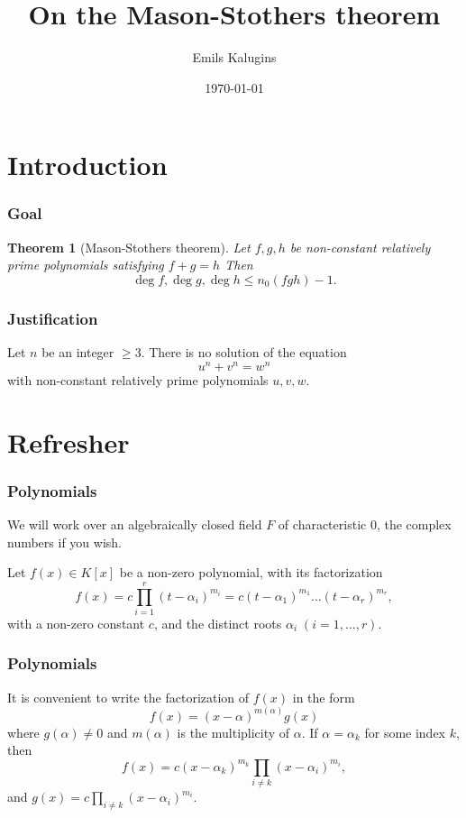 \documentclass[envcountsect]{beamer}
\author{Emils Kalugins}
\title{On the Mason-Stothers theorem}
\institute{University of Latvia}
\date{\today}
\newtheorem*{theorem*}{Theorem}
\begin{document}
\begin{frame}
\maketitle

\end{frame}

\section{Introduction}

\begin{frame}
\frametitle{Goal}

\begin{theorem*}[Mason-Stothers theorem]
Let $f,g,h$ be non-constant relatively prime polynomials satisfying $f+g=h$
Then \[\operatorname{deg}f, \operatorname{deg}g, \operatorname{deg}h \leq
  n_0(fgh) -1.\]
\end{theorem*}
\end{frame}

\begin{frame}
\frametitle{Justification}
\begin{theorem}
Let $n$ be an integer $\geq 3.$ There is no solution of the equation \[u^n +
  v^n = w^n\] with non-constant relatively prime polynomials $u,v,w$. 
\end{theorem}

\end{frame}

\section{Refresher}
\begin{frame}
\frametitle{Polynomials}
We will work over an algebraically closed field $F$ of characteristic 0, the complex
numbers if you wish.

Let $f(x) \in K[x]$ be a non-zero polynomial, with its factorization
\begin{equation} \label{eq:fac}
  f(x) = c\prod_{i=1}^r(t-\alpha_i)^{m_i}=c(t-\alpha_1)^{m_{1}} \dots (t-\alpha_r)^{m_r},
\end{equation}
with a non-zero constant $c$, and the distinct roots $\alpha_i \; (i=1,\dots,r).$
\end{frame}

\begin{frame}
\frametitle{Polynomials}

It is convenient to write the factorization of $f(x)$ in the form
\[
  f(x) = (x-\alpha)^{m(\alpha)}g(x)
\]
where \( g ( \alpha ) \neq 0 \) and $ m ( \alpha ) $ is the
multiplicity of $\alpha$. If $ \alpha = \alpha_k $ for some index $k$, then
\[
f(x) = c(x- \alpha_k )^{m_k}\prod_{i \neq k}(x-\alpha_i)^{m_i},
\]
and $g(x) = c\prod_{i \neq k}(x-\alpha_i)^{m_i}$.


\end{frame}
\end{document}
